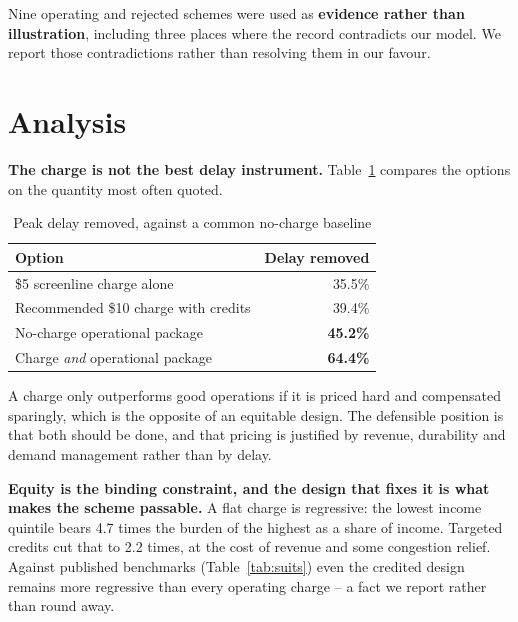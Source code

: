 \documentclass[11pt,letterpaper]{article}
\begin{document}
Nine operating and rejected schemes were used as \textbf{evidence rather than
illustration}, including three places where the record contradicts our model. We
report those contradictions rather than resolving them in our favour.

\section*{Analysis}

\textbf{The charge is not the best delay instrument.} Table~\ref{tab:delay}
compares the options on the quantity most often quoted.

\begin{table}[h]
\begin{singlespace}
\centering
\small
\caption{Peak delay removed, against a common no-charge baseline}
\label{tab:delay}
\begin{tabular}{lr}
\toprule
\textbf{Option} & \textbf{Delay removed} \\
\midrule
\$5 screenline charge alone & 35.5\% \\
Recommended \$10 charge with credits & 39.4\% \\
No-charge operational package & \textbf{45.2\%} \\
Charge \emph{and} operational package & \textbf{64.4\%} \\
\bottomrule
\end{tabular}
\end{singlespace}
\end{table}

A charge only outperforms good operations if it is priced hard and compensated
sparingly, which is the opposite of an equitable design. The defensible position
is that both should be done, and that pricing is justified by revenue,
durability and demand management rather than by delay.

\textbf{Equity is the binding constraint, and the design that fixes it is what
makes the scheme passable.} A flat charge is regressive: the lowest income
quintile bears 4.7 times the burden of the highest as a share of income.
Targeted credits cut that to 2.2 times, at the cost of revenue and some
congestion relief. Against published benchmarks (Table~\ref{tab:suits}) even the
credited design remains more regressive than every operating charge -- a fact we
report rather than round away.
\end{document}

